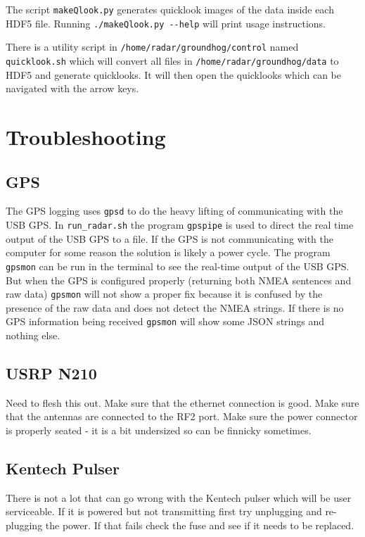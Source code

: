 \documentclass[titlepage]{article}
\begin{document}
The script \verb|makeQlook.py| generates quicklook images of the data inside each HDF5 file. Running \verb|./makeQlook.py --help| will print usage instructions.

There is a utility script in \verb|/home/radar/groundhog/control| named \verb|quicklook.sh| which will convert all files in \verb|/home/radar/groundhog/data| to HDF5 and generate quicklooks. It will then open the quicklooks which can be navigated with the arrow keys.

\section{Troubleshooting}
\subsection{GPS} \label{trouble_gps}
The GPS logging uses \verb|gpsd| to do the heavy lifting of communicating with the USB GPS. In \verb|run_radar.sh| the program \verb|gpspipe| is used to direct the real time output of the USB GPS to a file. If the GPS is not communicating with the computer for some reason the solution is likely a power cycle. The program \verb|gpsmon| can be run in the terminal to see the real-time output of the USB GPS. But when the GPS is configured properly (returning both NMEA sentences and raw data) \verb|gpsmon| will not show a proper fix because it is confused by the presence of the raw data and does not detect the NMEA strings. If there is no GPS information being received \verb|gpsmon| will show some JSON strings and nothing else.

\subsection{USRP N210} \label{trouble_usrp}
Need to flesh this out. Make sure that the ethernet connection is good. Make sure that the antennas are connected to the RF2 port. Make sure the power connector is properly seated - it is a bit undersized so can be finnicky sometimes.

\subsection{Kentech Pulser} \label{trouble_xmit}
There is not a lot that can go wrong with the Kentech pulser which will be user serviceable. If it is powered but not transmitting first try unplugging and re-plugging the power. If that fails check the fuse and see if it needs to be replaced.
\end{document}
